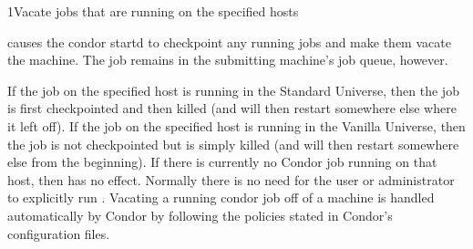 \begin{ManPage}{}{1}{Vacate jobs that are running on the specified hosts}
\label{man-condor-vacate}
\Synopsis {}

\Description
{} causes the condor startd to checkpoint any running jobs
and make them vacate the machine. The job remains in
the submitting machine's job queue, however. 

If the job on the specified host is running in the Standard Universe, then the
job is first checkpointed and then killed (and will then restart somewhere
else where it left off). If the job on the specified host is running in the
Vanilla Universe, then the job is not checkpointed but is simply killed (and
will then restart somewhere else from the beginning). If there is currently
no Condor job running on that host, then  has no effect. 
 Normally there is no need for the user or administrator to explicitly run
. Vacating a running condor job off of a machine is handled
automatically by Condor by following the policies stated in Condor's
configuration files.   
\begin{Options}
\end{Options}

\end{ManPage}
